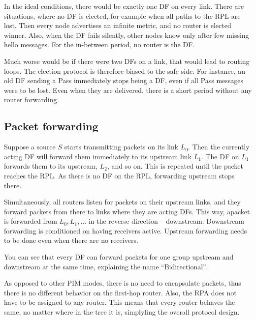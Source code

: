 In the ideal conditions, there would be exactly one DF on every link. There are
situations, where no DF is elected, for example when all paths to the RPL are
lost. Then every node advertises an infinite metric, and no router is elected
winner. Also, when the DF fails silently, other nodes know only after few
missing hello messages. For the in-between period, no router is the DF.

Much worse would be if there were two DFs on a link, that would lead to routing loops. The election protocol
is therefore biased to the safe side. For instance, an old DF sending a Pass immediately
stops being a DF, even if all Pass messages were to be lost. Even when they are
delivered, there is a short period without any router forwarding.

\subsection{Packet forwarding}

Suppose a source $S$ starts transmitting packets on its link $L_0$. Then
the currently acting DF will forward them immediately to its upstream link $L_1$.
The DF on $L_1$ forwards them to its upstream, $L_2$, and so on. This is repeated
until the packet reaches the RPL. As there is no DF on the RPL, forwarding upstream stops
there.

Simultaneously, all routers listen for packets on their upstream links, and they
forward packets from there to links where they are acting DFs. This way, apacket
is forwarded from $L_0, L_1, \dots$ in the reverse direction -- downstream.
Downstream forwarding is conditioned on having receivers active. Upstream
forwarding needs to be done even when there are no receivers.

You can see that every DF can forward packets for one group upstream and
downstream at the same time, explaining the name ``Bidirectional''.

As opposed to other PIM modes, there is no need to encapsulate packets, thus
there is no different behavior on the first-hop router. Also, the RPA does not have
to be assigned to any router. This means that every router behaves the same, no
matter where in the tree it is, simplyfing the overall protocol design.
